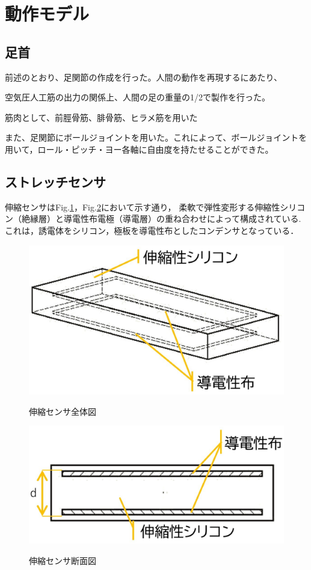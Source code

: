 \section{動作モデル}
\subsection{足首}
前述のとおり、足関節の作成を行った。人間の動作を再現するにあたり、

空気圧人工筋の出力の関係上、人間の足の重量の1/2で製作を行った。

筋肉として、前脛骨筋、腓骨筋、ヒラメ筋を用いた

また、足関節にボールジョイントを用いた。これによって、ボールジョイントを用いて，ロール・ピッチ・ヨー各軸に自由度を持たせることができた。

\subsection{ストレッチセンサ}
伸縮センサはFig.\ref{伸縮センサ全体図}，Fig.\ref{伸縮センサ断面図}において示す通り，
柔軟で弾性変形する伸縮性シリコン（絶縁層）と導電性布電極（導電層）の重ね合わせによって構成されている.
これは，誘電体をシリコン，極板を導電性布としたコンデンサとなっている．

\begin{figure}[h]
    \begin{center}
        \label{伸縮センサ全体図}
        \includegraphics[width=0.5\columnwidth,clip]{./2_measurement/スライド1.eps}
        \caption{伸縮センサ全体図}
    \end{center}
\end{figure}
\begin{figure}[h]
    \begin{center}       
        \label{伸縮センサ断面図}
        \includegraphics[width=0.5\columnwidth,clip]{./2_measurement/スライド2.eps}
        \caption{伸縮センサ断面図}
    \end{center}
\end{figure}

